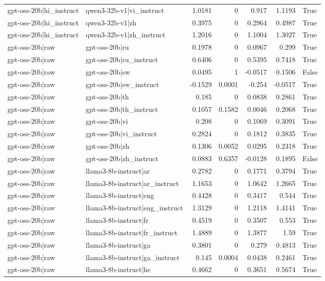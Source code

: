 \begin{table}
\begin{tabular}{l l r r r r l}
gpt-oss-20b|hi_instruct & qwen3-32b-v1|vi_instruct & 1.0181 & 0 & 0.917 & 1.1193 & True \\
gpt-oss-20b|hi_instruct & qwen3-32b-v1|zh & 0.3975 & 0 & 0.2964 & 0.4987 & True \\
gpt-oss-20b|hi_instruct & qwen3-32b-v1|zh_instruct & 1.2016 & 0 & 1.1004 & 1.3027 & True \\
gpt-oss-20b|raw & gpt-oss-20b|ru & 0.1978 & 0 & 0.0967 & 0.299 & True \\
gpt-oss-20b|raw & gpt-oss-20b|ru_instruct & 0.6406 & 0 & 0.5395 & 0.7418 & True \\
gpt-oss-20b|raw & gpt-oss-20b|sw & 0.0495 & 1 & -0.0517 & 0.1506 & False \\
gpt-oss-20b|raw & gpt-oss-20b|sw_instruct & -0.1529 & 0.0001 & -0.254 & -0.0517 & True \\
gpt-oss-20b|raw & gpt-oss-20b|th & 0.185 & 0 & 0.0838 & 0.2861 & True \\
gpt-oss-20b|raw & gpt-oss-20b|th_instruct & 0.1057 & 0.1582 & 0.0046 & 0.2068 & True \\
gpt-oss-20b|raw & gpt-oss-20b|vi & 0.208 & 0 & 0.1069 & 0.3091 & True \\
gpt-oss-20b|raw & gpt-oss-20b|vi_instruct & 0.2824 & 0 & 0.1812 & 0.3835 & True \\
gpt-oss-20b|raw & gpt-oss-20b|zh & 0.1306 & 0.0052 & 0.0295 & 0.2318 & True \\
gpt-oss-20b|raw & gpt-oss-20b|zh_instruct & 0.0883 & 0.6357 & -0.0128 & 0.1895 & False \\
gpt-oss-20b|raw & llama3-8b-instruct|ar & 0.2782 & 0 & 0.1771 & 0.3794 & True \\
gpt-oss-20b|raw & llama3-8b-instruct|ar_instruct & 1.1653 & 0 & 1.0642 & 1.2665 & True \\
gpt-oss-20b|raw & llama3-8b-instruct|eng & 0.4428 & 0 & 0.3417 & 0.544 & True \\
gpt-oss-20b|raw & llama3-8b-instruct|eng_instruct & 1.3129 & 0 & 1.2118 & 1.4141 & True \\
gpt-oss-20b|raw & llama3-8b-instruct|fr & 0.4519 & 0 & 0.3507 & 0.553 & True \\
gpt-oss-20b|raw & llama3-8b-instruct|fr_instruct & 1.4889 & 0 & 1.3877 & 1.59 & True \\
gpt-oss-20b|raw & llama3-8b-instruct|ga & 0.3801 & 0 & 0.279 & 0.4813 & True \\
gpt-oss-20b|raw & llama3-8b-instruct|ga_instruct & 0.145 & 0.0004 & 0.0438 & 0.2461 & True \\
gpt-oss-20b|raw & llama3-8b-instruct|he & 0.4662 & 0 & 0.3651 & 0.5674 & True \\

\end{tabular}
\end{table}
